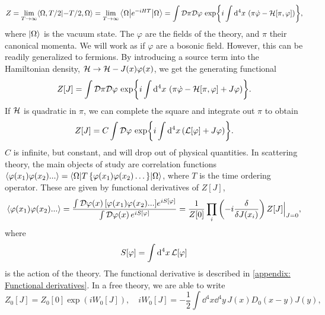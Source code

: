 \begin{equation}
    Z = \lim_{T\rightarrow \infty} \langle {\Omega, T/2} | {-T/2, \Omega} \rangle
    = \lim_{T\rightarrow \infty} \left\langle \Omega {\left|  e^{-iHT}  \right|} \Omega \right\rangle
    = \int \mathcal D \pi \mathcal D \varphi \, \exp{ i \int \dd^4 x \, \left(\pi \dot \varphi - \mathcal{H}[\pi, \varphi]\right) },
\end{equation}
%
where $\ket{\Omega}$ is the vacuum state.
The  $\varphi$ are the fields of the theory, and $\pi$ their canonical momenta. We will work as if $\varphi$ are a bosonic field. 
However, this can be readily generalized to fermions.
By introducing a source term into the Hamiltonian density, $\mathcal{H} \rightarrow \mathcal{H} - J(x)\varphi(x)$, we get the generating functional
%
\begin{equation}
    Z[J] = 
    \int \mathcal D \pi \mathcal D \varphi \, 
    \exp{ i \int \dd^4 x \, \left(\pi \dot \varphi - \mathcal{H}[\pi, \varphi]+ J\varphi\right)}.
\end{equation}
%
If $\mathcal{H}$ is quadratic in $\pi$, we can complete the square and integrate out $\pi$ to obtain
%
\begin{equation}
    Z[J] = C \int \mathcal D \varphi \, \exp{i \int \dd^4 x\, (\mathcal{L}[\varphi] + J \varphi)}.
\end{equation}
%
$C$ is infinite, but constant, and will drop out of physical quantities.
In scattering theory, the main objects of study are correlation functions 
$\left\langle \varphi(x_1)\varphi(x_2)... \right\rangle = \left\langle \Omega {\left| T\left\{\varphi(x_1)\varphi(x_2)\dots\right\} \right|} \Omega \right\rangle$,
where $T$ is the time ordering operator.
These are given by functional derivatives of $Z[J]$,
%
\begin{equation}
    \label{correlator from generating functional}
    \ex{\varphi(x_1)\varphi(x_2)...}
    = 
    \frac{\int \D \varphi(x)\, [\varphi(x_1)\varphi(x_2)...] e^{i S[\varphi]}}
        {\int \D \varphi(x)\, e^{i S[\varphi]}}
    =
    \frac{1}{Z[0]} \prod_i\left( -i  \fdv{}{J(x_i)} \right) Z[J]\Big|_{J = 0},
\end{equation}
%
where 
\begin{equation}
    S[\varphi] = \int \dd^4 x \, \mathcal{L}[\varphi]
\end{equation}
is the action of the theory.
The functional derivative is described in \autoref{appendix: Functional derivatives}.
In a free theory, we are able to write
\begin{equation}
    Z_0[J] = Z_0[0] \exp(i W_0[J]), \quad 
    iW_0[J] = -\frac{1}{2} \int \dd^4 x \dd^4 y \, J(x) D_0(x - y) J(y),
\end{equation}
